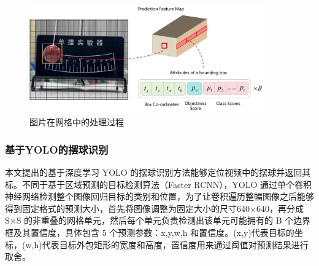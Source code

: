 \begin{figure}[ht]
    \centering
    \includegraphics[width=0.9\textwidth]{figures/图片在网格中的处理.pdf}
    \caption{图片在网格中的处理过程}
    \label{fig:grid_process}
\end{figure}


\subsubsection{基于YOLO的摆球识别}
本文提出的基于深度学习 YOLO 的摆球识别方法能够定位视频中的摆球并返回其标。不同于基于区域预测的目标检测算法（Faster RCNN），YOLO 通过单个卷积神经网络检测整个图像回归目标的类别和位置，为了让卷积遍历整幅图像之后能够得到固定格式的预测大小，首先将图像调整为固定大小的尺寸640×640，再分成S×S 的非重叠的网格单元，然后每个单元负责检测出该单元可能拥有的 B 个边界框及其置信度，具体包含 5 个预测参数：x,y,w,h 和置信度。(x,y)代表目标的坐标，(w,h)代表目标外包矩形的宽度和高度，置信度用来通过阈值对预测结果进行取舍。 